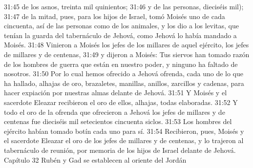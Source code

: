31:45 de los asnos, treinta mil quinientos;  
31:46 y de las personas, dieciséis mil);  
31:47 de la mitad, pues, para los hijos de Israel, tomó Moisés uno de cada cincuenta, así de las personas como de los animales, y los dio a los levitas, que tenían la guarda del tabernáculo de Jehová, como Jehová lo había mandado a Moisés.  
31:48 Vinieron a Moisés los jefes de los millares de aquel ejército, los jefes de millares y de centenas,  
31:49 y dijeron a Moisés: Tus siervos han tomado razón de los hombres de guerra que están en nuestro poder, y ninguno ha faltado de nosotros.  
31:50 Por lo cual hemos ofrecido a Jehová ofrenda, cada uno de lo que ha hallado, alhajas de oro, brazaletes, manillas, anillos, zarcillos y cadenas, para hacer expiación por nuestras almas delante de Jehová.  
31:51 Y Moisés y el sacerdote Eleazar recibieron el oro de ellos, alhajas, todas elaboradas.  
31:52 Y todo el oro de la ofrenda que ofrecieron a Jehová los jefes de millares y de centenas fue dieciséis mil setecientos cincuenta siclos.  
31:53 Los hombres del ejército habían tomado botín cada uno para sí.  
31:54 Recibieron, pues, Moisés y el sacerdote Eleazar el oro de los jefes de millares y de centenas, y lo trajeron al tabernáculo de reunión, por memoria de los hijos de Israel delante de Jehová.  
Capítulo 32 
Rubén y Gad se establecen al oriente del Jordán   

